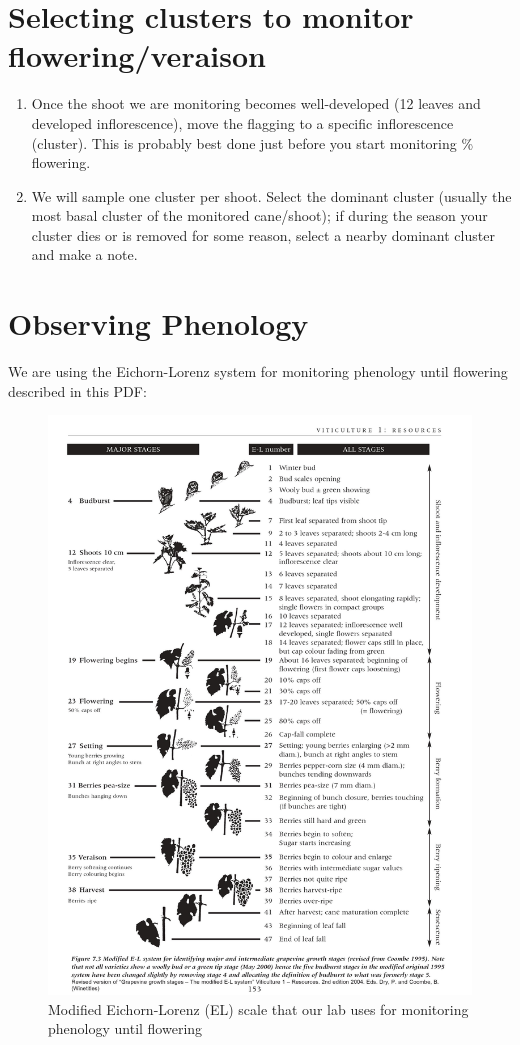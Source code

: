 \documentclass[11pt,letter]{article}
\begin{document}
\section{Selecting clusters to monitor flowering/veraison} %
\begin{enumerate}
	\item Once the shoot we are monitoring becomes well-developed (12 leaves and developed inflorescence), move the flagging to a specific inflorescence (cluster). This is probably best done just before you start monitoring \% flowering. 
	\item We will sample one cluster per shoot. Select the dominant cluster (usually the most basal cluster of the monitored cane/shoot); if during the season your cluster dies or is removed for some reason, select a nearby dominant cluster and make a note. 

\end{enumerate}

\section{Observing Phenology}
We are using the Eichorn-Lorenz system for monitoring phenology until flowering described in this PDF: \\

\begin{figure}%
  \includegraphics[width=\linewidth]{ELScale.jpg}
  \caption{ Modified Eichorn-Lorenz (EL) scale that our lab uses for monitoring phenology until flowering }
  \label{fig:ELScale}
\end{figure}
\end{document}
